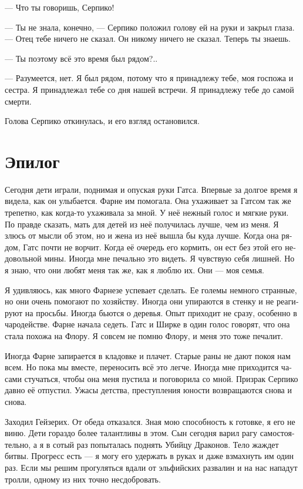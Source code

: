 \documentclass[a4paper,12pt,fleqn]{book}\usepackage{polyglossia}\setdefaultlanguage[babelshorthands=true]{russian}\setotherlanguage{english}\defaultfontfeatures{Ligatures=TeX,Mapping=tex-text}\usepackage{xcolor}\newcommand{\ml}[3]{#2}
\begin{document}
--- Что ты говоришь, Серпико!

--- Ты не знала, конечно, --- Серпико положил голову ей на руки и закрыл глаза.
--- Отец тебе ничего не сказал.
Он никому ничего не сказал.
Теперь ты знаешь.

--- Ты поэтому всё это время был рядом?..

--- Разумеется, нет.
Я был рядом, потому что я принадлежу тебе, моя госпожа и сестра.
Я принадлежал тебе со дня нашей встречи.
Я принадлежу тебе до самой смерти.

Голова Серпико откинулась, и его взгляд остановился.

\section{Эпилог}

Сегодня дети играли, поднимая и опуская руки Гатса.
Впервые за долгое время я видела, как он улыбается.
Фарне им помогала.
Она ухаживает за Гатсом так же трепетно, как когда-то ухаживала за мной.
У неё нежный голос и мягкие руки.
По правде сказать, мать для детей из неё получилась лучше, чем из меня.
Я злюсь от мысли об этом, но и жена из неё вышла бы куда лучше.
Когда она рядом, Гатс почти не ворчит.
Когда её очередь его кормить, он ест без этой его недовольной мины.
Иногда мне печально это видеть.
Я чувствую себя лишней.
Но я знаю, что они любят меня так же, как я люблю их.
Они --- моя семья.

Я удивляюсь, как много Фарнезе успевает сделать.
Ее големы немного странные, но они очень помогают по хозяйству.
Иногда они упираются в стенку и не реагируют на просьбы.
Иногда бьются о деревья.
Опыт приходит не сразу, особенно в чародействе.
Фарне начала седеть.
Гатс и Ширке в один голос говорят, что она стала похожа на Флору.
Я совсем не помню Флору, и меня это тоже печалит.

Иногда Фарне запирается в кладовке и плачет.
Старые раны не дают покоя нам всем.
Но пока мы вместе, переносить всё это легче.
Иногда мне приходится часами стучаться, чтобы она меня пустила и поговорила со мной.
Призрак Серпико давно её отпустил.
Ужасы детства, преступления юности возвращаются снова и снова.

Заходил Гейзерих.
От обеда отказался.
Зная мою способность к готовке, я его не виню.
Дети гораздо более талантливы в этом.
Сын сегодня варил рагу самостоятельно, а я в сотый раз попыталась поднять Убийцу Драконов.
Тело жаждет битвы.
Прогресс есть --- я могу его удержать в руках и даже взмахнуть им один раз.
Если мы решим прогуляться вдали от эльфийских развалин и на нас нападут тролли, одному из них точно несдобровать.
\end{document}
